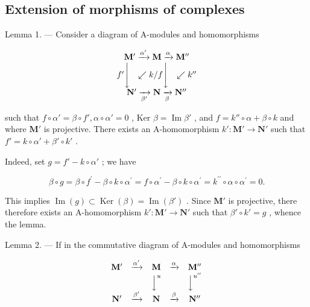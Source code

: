 \subsection{Extension of morphisms of complexes}

Lemma 1. --- Consider a diagram of A-modules and homomorphisms

\[
\begin{array}{c} \mathbf {M} ^ {\prime} \xrightarrow {\alpha^ {\prime}} \mathbf {M} \xrightarrow {\alpha} \mathbf {M} ^ {\prime \prime} \\ f ^ {\prime} \Biggl \downarrow \quad \swarrow k / f \Biggl \downarrow \quad \swarrow k ^ {\prime \prime} \\ \mathbf {N} ^ {\prime} \xrightarrow [ \beta^ {\prime} ]{} \mathbf {N} \xrightarrow [ \beta ]{} \mathbf {N} ^ {\prime \prime} \end{array}
\]

such that \(f \circ \alpha' = \beta \circ f', \alpha \circ \alpha' = 0\) , Ker \(\beta = \operatorname{Im} \beta'\) , and \(f = k'' \circ \alpha + \beta \circ k\) and where \(\mathbf{M}'\) is projective. There exists an A-homomorphism \(k': \mathbf{M}' \to \mathbf{N}'\) such that \(f' = k \circ \alpha' + \beta' \circ k'\) .

Indeed, set \(g = f' - k \circ \alpha'\) ; we have

\[
\beta \circ g = \beta \circ f ^ {\prime} - \beta \circ k \circ \alpha^ {\prime} = f \circ \alpha^ {\prime} - \beta \circ k \circ \alpha^ {\prime} = k ^ {\prime \prime} \circ \alpha \circ \alpha^ {\prime} = 0.
\]

This implies \(\operatorname{Im}(g) \subset \operatorname{Ker}(\beta) = \operatorname{Im}(\beta')\) . Since \(\mathbf{M}'\) is projective, there therefore exists an A-homomorphism \(k': \mathbf{M}' \to \mathbf{N}'\) such that \(\beta' \circ k' = g\) , whence the lemma.

Lemma 2. --- If in the commutative diagram of A-modules and homomorphisms

\[
\begin{array}{c c c c c} \mathbf {M} ^ {\prime} & \xrightarrow {\alpha^ {\prime}} & \mathbf {M} & \xrightarrow {\alpha} & \mathbf {M} ^ {\prime \prime} \\ & & \Big \downarrow^ {u} & & \Big \downarrow^ {u ^ {\prime \prime}} \\ \mathbf {N} ^ {\prime} & \xrightarrow {\beta^ {\prime}} & \mathbf {N} & \xrightarrow {\beta} & \mathbf {N} ^ {\prime \prime} \end{array}
\]

